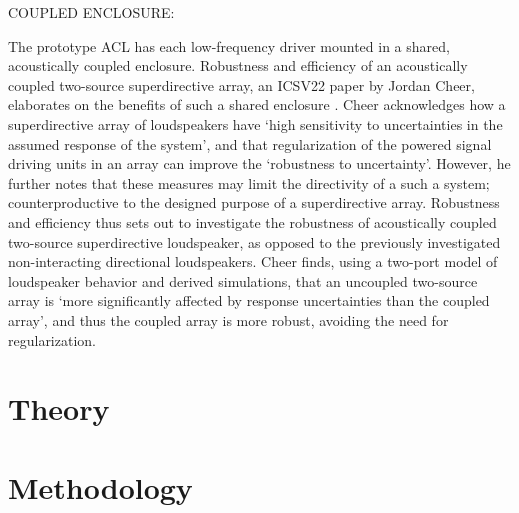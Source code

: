 \documentclass{report}
\begin{document}
    COUPLED ENCLOSURE:

    The prototype ACL has each low-frequency driver mounted in a shared, acoustically coupled enclosure.
    Robustness and efficiency of an acoustically coupled two-source superdirective array, an ICSV22 paper by Jordan Cheer, elaborates on the benefits of such a shared enclosure \cite{cheer2015robustness}.
    Cheer acknowledges how a superdirective array of loudspeakers have `high sensitivity to uncertainties in the assumed response of the system', and that regularization of the powered signal driving units in an array can improve the `robustness to uncertainty'.
    However, he further notes that these measures may limit the directivity of a such a system; counterproductive to the designed purpose of a superdirective array.
    Robustness and efficiency thus sets out to investigate the robustness of acoustically coupled two-source superdirective loudspeaker, as opposed to the previously investigated non-interacting directional loudspeakers.
    Cheer finds, using a two-port model of loudspeaker behavior and derived simulations, that an uncoupled two-source array is `more significantly affected by response uncertainties than the coupled array', and thus the coupled array is more robust, avoiding the need for regularization.

    
    
    





    







\chapter{Theory}


\chapter{Methodology}
\end{document}

